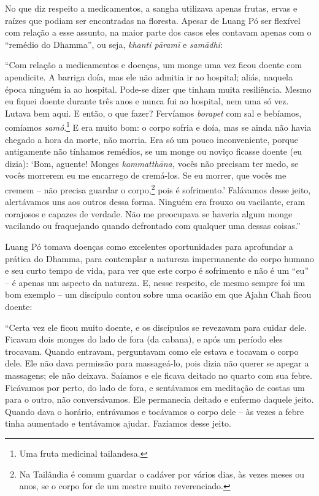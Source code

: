 No que diz respeito a medicamentos, a sangha utilizava apenas frutas,
ervas e raízes que podiam ser encontradas na floresta. Apesar de Luang
Pó ser flexível com relação a esse assunto, na maior parte dos casos
eles contavam apenas com o ``remédio do Dhamma'', ou seja, \emph{khanti
pāramī} e \emph{samādhi}:

``Com relação a medicamentos e doenças, um monge uma vez ficou doente
com apendicite. A barriga doía, mas ele não admitia ir ao hospital;
aliás, naquela época ninguém ia ao hospital. Pode-se dizer que tinham
muita resiliência. Mesmo eu fiquei doente durante três anos e nunca fui
ao hospital, nem uma só vez. Lutava bem aqui. E então, o que fazer?
Fervíamos \emph{borapet} com sal e bebíamos, comíamos
\emph{samó}.\footnote{Uma fruta medicinal tailandesa.} E era
muito bom: o corpo sofria e doía, mas se ainda não havia chegado a hora
da morte, não morria. Era só um pouco inconveniente, porque antigamente
não tínhamos remédios, se um monge ou noviço ficasse doente (eu dizia):
`Bom, aguente! Monges \emph{kammatthāna,} vocês não precisam ter medo,
se vocês morrerem eu me encarrego de cremá-los. Se eu morrer, que vocês
me cremem -- não precisa guardar o corpo,\footnote{Na Tailândia é comum
  guardar o cadáver por vários dias, às vezes meses ou anos, se o corpo
  for de um mestre muito reverenciado.} pois é sofrimento.' Falávamos
desse jeito, alertávamos uns aos outros dessa forma. Ninguém era frouxo
ou vacilante, eram corajosos e capazes de verdade. Não me preocupava se
haveria algum monge vacilando ou fraquejando quando defrontado com
qualquer uma dessas coisas.''

Luang Pó tomava doenças como excelentes oportunidades para aprofundar a
prática do Dhamma, para contemplar a natureza impermanente do corpo
humano e seu curto tempo de vida, para ver que este corpo é sofrimento e
não é um ``eu'' -- é apenas um aspecto da natureza. E, nesse respeito,
ele mesmo sempre foi um bom exemplo -- um discípulo contou sobre uma
ocasião em que Ajahn Chah ficou doente:

``Certa vez ele ficou muito doente, e os discípulos se revezavam para
cuidar dele. Ficavam dois monges do lado de fora (da cabana), e após um
período eles trocavam. Quando entravam, perguntavam como ele estava e
tocavam o corpo dele. Ele não dava permissão para massageá-lo, pois
dizia não querer se apegar a massagens; ele não deixava. Saíamos e ele
ficava deitado no quarto com sua febre. Ficávamos por perto, do lado de
fora, e sentávamos em meditação de costas um para o outro, não
conversávamos. Ele permanecia deitado e enfermo daquele jeito. Quando
dava o horário, entrávamos e tocávamos o corpo dele -- às vezes a febre
tinha aumentado e tentávamos ajudar. Fazíamos desse jeito.

